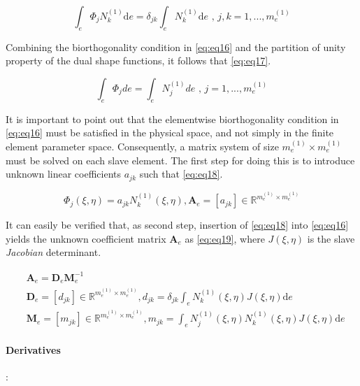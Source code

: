 \documentclass[a4paper,10pt]{article} %
\begin{document}
\begin{equation}\label{eq:eq16}
    \int_{e}\Phi_j N_k^{(1)} \text{d}e = \delta_{jk} \int_{e} N_k^{(1)} \text{d}e \text{ , } j,k=1,...,m_e^{(1)}
\end{equation}

Combining the biorthogonality condition in \eqref{eq:eq16} and the partition of unity property of the dual shape functions, it follows that \eqref{eq:eq17}.

\begin{equation}\label{eq:eq17}
    \int_e \Phi_j de =  \int_e N_j^{(1)} de \text{ , } j=1,...,m_e^{(1)}
\end{equation}

It is important to point out that the elementwise biorthogonality condition in \eqref{eq:eq16} must be satisfied in the physical space, and not simply in the finite element parameter space. Consequently, a matrix system of size $m_e^{(1)} \times m_e^{(1)}$ must be solved on each slave element. The first step for doing this is to introduce unknown linear coefficients $a_{jk}$ such that \eqref{eq:eq18}.

\begin{equation}\label{eq:eq18}
    \Phi_j(\xi, \eta) = a_{jk} N_k^{(1)}\left(\xi, \eta \right), \mathbf{A}_e = [a_{jk}] \in \mathbb{R}^{m_e^{(1)} \times m_e^{(1)}}
\end{equation}
 
 It can easily be verified that, as second step, insertion of \eqref{eq:eq18} into \eqref{eq:eq16} yields the unknown
coefficient matrix $\mathbf{A}_e$ as \eqref{eq:eq19}, where $J(\xi, \eta)$ is the slave \textit{Jacobian} determinant.

\begin{equation}\label{eq:eq19}
\begin{aligned}
 & \mathbf{A}_e = \mathbf{D}_e\mathbf{M}_e^{-1} \\
 & \mathbf{D}_e = [d_{jk}] \in \mathbb{R}^{m_e^{(1)} \times m_e^{(1)}}, d_{jk} = \delta_{jk} \int_e N_k^{(1)}(\xi, \eta) J(\xi, \eta) \text{d}e \\
 & \mathbf{M}_e = [m_{jk}] \in \mathbb{R}^{m_e^{(1)} \times m_e^{(1)}}, m_{jk} = \int_e N_j^{(1)}(\xi, \eta) N_k^{(1)}(\xi, \eta) J(\xi, \eta) \text{d}e
\end{aligned}
 \end{equation}

\paragraph{Derivatives}:
\end{document}
